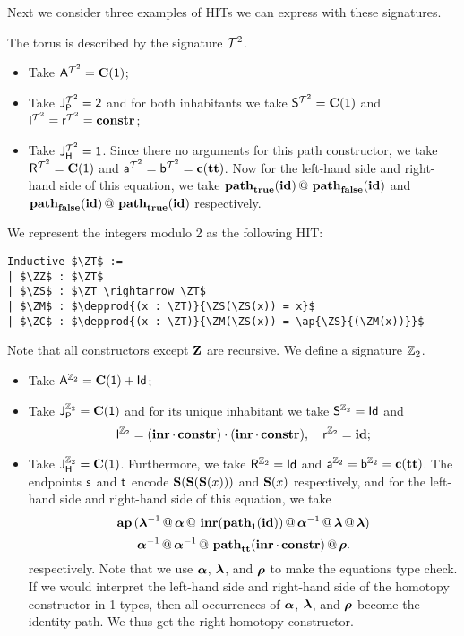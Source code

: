 Next we consider three examples of HITs we can express with these signatures.

\begin{example}
\label{ex:torus}
The torus is described by the signature $\torus$.
\begin{itemize}
	\item Take $\pointconstr[\torus] = \constantP{\unit}$;
	\item Take $\pathlabel[\torus] = \bool$ and for both inhabitants we take $\patharg[\torus] = \constantP{\unit}$ and $\pathleft[\torus] = \pathright[\torus] = \constr$;
	\item Take $\homotlabel[\torus] = \unit$.
	Since there no arguments for this path constructor, we take $\homotpointarg[\torus] = \constantP{\unit}$ and $\pathargleft[\torus] = \pathargright[\torus] = \Ce(\unitt)$.
	Now for the left-hand side and right-hand side of this equation, we take $\hconcat{\hconstr{\booltrue}{\idENA}}{\hconstr{\boolfalse}{\idENA}}$ and $\hconcat{\hconstr{\boolfalse}{\idENA}}{\hconstr{\booltrue}{\idENA}}$ respectively. 
\end{itemize}
\end{example}

\begin{example}
\label{ex:mod}
We represent the integers modulo 2 as the following HIT:
\begin{lstlisting}[mathescape=true]
Inductive $\ZT$ :=
| $\ZZ$ : $\ZT$
| $\ZS$ : $\ZT \rightarrow \ZT$
| $\ZM$ : $\depprod{(x : \ZT)}{\ZS(\ZS(x)) = x}$
| $\ZC$ : $\depprod{(x : \ZT)}{\ZM(\ZS(x)) = \ap{\ZS}{(\ZM(x))}}$
\end{lstlisting}
Note that all constructors except $\ZZ$ are recursive.
We define a signature $\ZT$.
\begin{itemize}
	\item Take $\pointconstr[\ZT] = \sumP{\constantP{\unit}}{\idP}$;
	\item Take $\pathlabel[\ZT] = \constantP{\unit}$ and for its unique inhabitant we take $\patharg[\ZT] = \idP$ and
	\[
	\pathleft[\ZT] = \comp{(\comp{\inre}{\constr})}{(\comp{\inre}{\constr})}, \quad
	\pathright[\ZT] = \idENA;
	\]
	\item Take $\homotlabel[\ZT] = \constantP{\unit}$.
	Furthermore, we take $\homotpointarg[\ZT] = \idP$ and $\pathargleft[\ZT] = \pathargright[\ZT] = \Ce(\unitt)$.
	The endpoints $\homotpathleft$ and $\homotpathright$ encode $\ZS(\ZS(\ZS(x)))$ and $\ZS(x)$ respectively,
	and for the left-hand side and right-hand side of this equation, we take
	\[
	\hap{(\hconcat{\hinv{\hlunitN}}{\hconcat{\hassocN}{\hconcat{\hinr{\hconstr{\unit}{\idENA}}}{\hconcat{\hinv{\hassocN}}{\hconcat{\hlunitN}{\hlunitN}}}}})}
	\]
	\[
	\hconcat{\hinv{\hassocN}}{\hconcat{\hinv{\hassocN}}{\hconcat{\hconstr{\unitt}{\comp{\inre}{\constr}}}{\hrunitN}}}.
	\]
	respectively.
	Note that we use $\hassocN$, $\hlunitN$, and $\hrunitN$ to make the equations type check.
	If we would interpret the left-hand side and right-hand side of  the homotopy constructor in 1-types,
	then all occurrences of $\hassocN$, $\hlunitN$, and $\hrunitN$ become the identity path.
	We thus get the right homotopy constructor.
\end{itemize}
\end{example}

